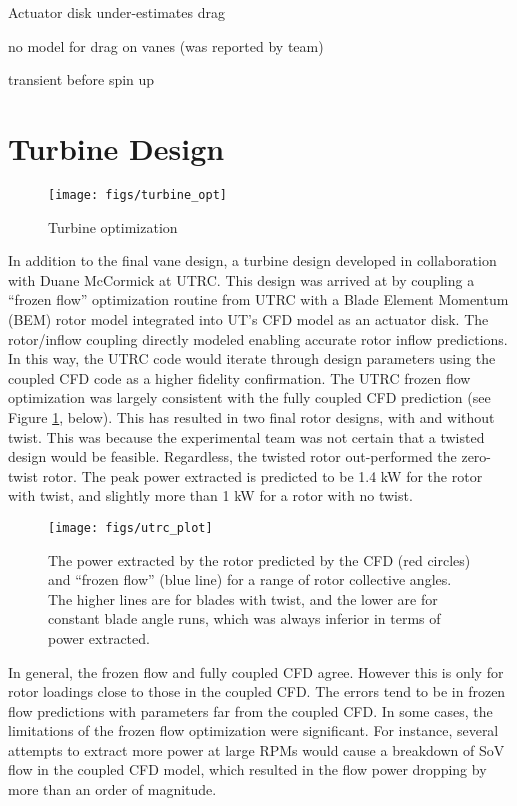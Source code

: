 Actuator disk under-estimates drag

no model for drag on vanes (was reported by team)

transient before spin up

\section{Turbine Design}

  \begin{figure}[!htb]
   \begin{center}
    \texttt{[image: figs/turbine\_opt]}
    \caption{Turbine optimization}
    \label{fig:ut_turbine}
   \end{center}
  \end{figure}

In addition to the final vane design, a turbine design developed in
collaboration with Duane McCormick at UTRC. This design was arrived at
by coupling a ``frozen flow'' optimization routine from UTRC with a Blade
Element Momentum (BEM) rotor model integrated into UT's CFD model as an
actuator disk. The rotor/inflow coupling directly modeled enabling
accurate rotor inflow predictions. In this way, the UTRC code would
iterate through design parameters using the coupled CFD code as a higher
fidelity confirmation. The UTRC frozen flow optimization was largely
consistent with the fully coupled CFD prediction (see Figure \ref{},
below). This has resulted in two final rotor designs, with and without
twist. This was because the experimental team was not certain that a
twisted design would be feasible. Regardless, the twisted rotor
out-performed the zero-twist rotor. The peak power extracted is
predicted to be 1.4 kW for the rotor with twist, and slightly more than
1 kW for a rotor with no twist. 

  \begin{figure}[!htb]
   \begin{center}
    \texttt{[image: figs/utrc\_plot]}
    \caption{The power extracted by the rotor predicted by the CFD (red
    circles) and ``frozen flow'' (blue line) for a range of rotor
    collective angles. The higher lines are for blades with twist, and
    the lower are for constant blade angle runs, which was always
    inferior in terms of power extracted.}
    \label{fig:UTRC_turbine}
   \end{center}
  \end{figure}


In general, the frozen flow and fully coupled CFD agree. However this is
only for rotor loadings close to those in the coupled CFD. The errors
tend to be in frozen flow predictions with parameters far from the
coupled CFD. In some cases, the limitations of the frozen flow
optimization were significant. For instance, several attempts
to extract more power at large RPMs would cause a breakdown of SoV
flow in the coupled CFD model, which resulted in the flow power dropping
by more than an order of magnitude.

